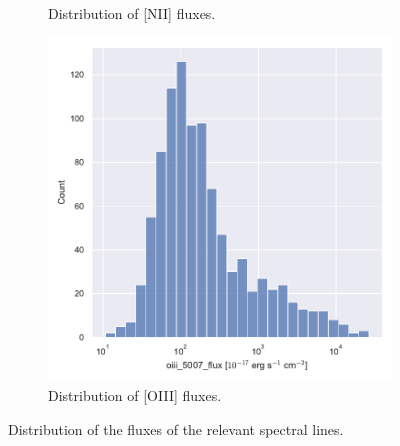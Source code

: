 \documentclass[letterpaper, oneside]{article}
\begin{document}
\begin{figure}[p]
\begin{subfigure}[b]{0.45\textwidth}
		\caption[]{Distribution of [NII] fluxes.}
		\label{fig:distr_nii}
	\end{subfigure}
	\hfill
	\begin{subfigure}[b]{0.45\textwidth}   
		\centering 
		\includegraphics[width=\textwidth]{../distr_oiii_5007_flux.pdf}
		\caption[]{Distribution of [OIII] fluxes.}
		\label{fig:distr_oiii}
	\end{subfigure}
	\caption{Distribution of the fluxes of the relevant spectral lines.} 
	\label{fig:flux_distributions}
\end{figure}



\end{document}
